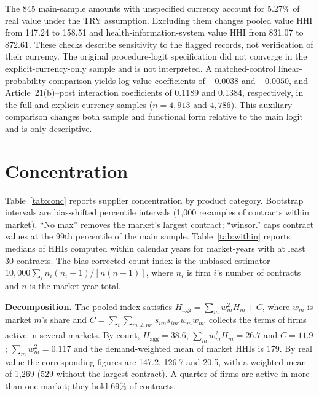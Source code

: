 \documentclass[11pt,a4paper]{article}
\begin{document}
The 845 main-sample amounts with unspecified currency account for 5.27\% of real value under the TRY assumption. Excluding them changes pooled value HHI from 147.24 to 158.51 and health-information-system value HHI from 831.07 to 872.61. These checks describe sensitivity to the flagged records, not verification of their currency. The original procedure-logit specification did not converge in the explicit-currency-only sample and is not interpreted. A matched-control linear-probability comparison yields log-value coefficients of $-0.0038$ and $-0.0050$, and Article~21(b)--post interaction coefficients of 0.1189 and 0.1384, respectively, in the full and explicit-currency samples ($n=4,913$ and $4,786$). This auxiliary comparison changes both sample and functional form relative to the main logit and is only descriptive.

\section{Concentration}
Table~\ref{tab:conc} reports supplier concentration by product category. Bootstrap intervals are bias-shifted percentile intervals (1,000 resamples of contracts within market). ``No max'' removes the market's largest contract; ``winsor.'' caps contract values at the 99th percentile of the main sample. Table~\ref{tab:within} reports medians of HHIs computed within calendar years for market-years with at least 30 contracts. The bias-corrected count index is the unbiased estimator $10{,}000\sum_i n_i(n_i-1)/[n(n-1)]$, where $n_i$ is firm $i$'s number of contracts and $n$ is the market-year total.

\begin{table}[h]\centering\scriptsize
\caption{Supplier concentration by product category (main sample; HHI on 0--10,000).}\label{tab:conc}
\resizebox{\textwidth}{!}{}
\end{table}

\begin{table}[h]\centering\small
\caption{Median within-year supplier HHI by product category.}\label{tab:within}
\resizebox{\textwidth}{!}{}
\end{table}

\textbf{Decomposition.} The pooled index satisfies $H_{\text{agg}}=\sum_m w_m^2 H_m + C$, where $w_m$ is market $m$'s share and $C=\sum_i\sum_{m\neq m'} s_{im}s_{im'}w_m w_{m'}$ collects the terms of firms active in several markets. By count, $H_{\text{agg}}=38.6$, $\sum_m w_m^2 H_m=26.7$ and $C=11.9$; $\sum_m w_m^2=0.117$ and the demand-weighted mean of market HHIs is 179. By real value the corresponding figures are 147.2, 126.7 and 20.5, with a weighted mean of 1,269 (529 without the largest contract). A quarter of firms are active in more than one market; they hold 69\% of contracts.
\end{document}
